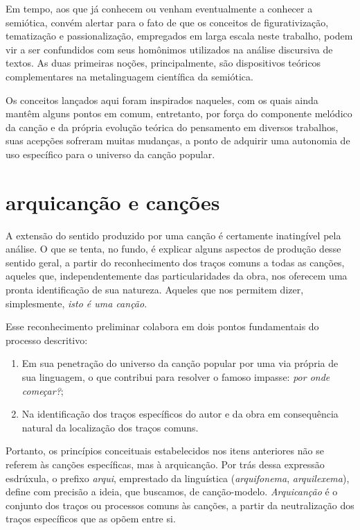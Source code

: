 Em tempo, aos que já conhecem ou venham eventualmente a conhecer a
semiótica, convém alertar para o fato de que os conceitos de
figurativização, tematização e passionalização, empregados em larga
escala neste trabalho, podem vir a ser confundidos com seus homônimos
utilizados na análise discursiva de textos. As duas primeiras noções,
principalmente, são dispositivos teóricos complementares na
metalinguagem científica da semiótica.

Os conceitos lançados aqui foram inspirados naqueles, com os quais ainda
mantêm alguns pontos em comum, entretanto, por força do componente
melódico da canção e da própria evolução teórica do pensamento em
diversos trabalhos, suas acepções sofreram muitas mudanças, a ponto de
adquirir uma autonomia de uso específico para o universo da canção
popular.

\section{arquicanção e canções}

A extensão do sentido produzido por uma canção é certamente inatingível
pela análise. O que se tenta, no fundo, é explicar alguns aspectos de
produção desse sentido geral, a partir do reconhecimento dos traços
comuns a todas as canções, aqueles que, independentemente das
particularidades da obra, nos oferecem uma pronta identificação de sua
natureza. Aqueles que nos permitem dizer, simplesmente, \textit{isto é uma
canção}.

Esse reconhecimento preliminar colabora em dois pontos fundamentais do
processo descritivo:

\begin{enumerate}%
\item Em sua penetração do universo da canção popular por uma via própria
de sua linguagem, o que contribui para resolver o famoso impasse: \textit{por
onde começar?};

\item Na identificação dos traços específicos do autor e da obra em
consequência natural da localização dos traços comuns.
\end{enumerate}

Portanto, os princípios conceituais estabelecidos nos itens anteriores
não se referem às canções específicas, mas à arquicanção. Por trás dessa
expressão esdrúxula, o prefixo \textit{arqui}, emprestado da linguística
(\textit{arquifonema}, \textit{arquilexema}), define com precisão a ideia, que buscamos,
de canção-modelo. \textit{Arquicanção} é o conjunto dos traços ou processos
comuns às canções, a partir da neutralização dos traços específicos que
as opõem entre si.

